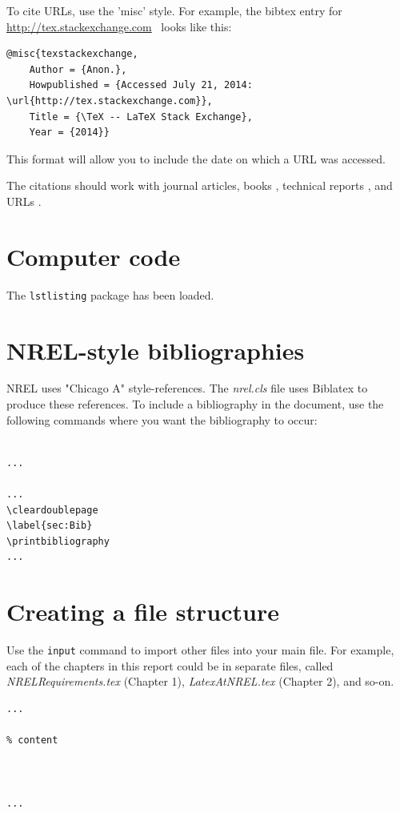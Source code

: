 To cite URLs, use the 'misc' style. For example, the bibtex entry for \href{http://tex.stackexchange.com}{http://tex.stackexchange.com}\ \cite{texstackexchange} looks like this:

\begin{verbatim}
@misc{texstackexchange,
	Author = {Anon.},
	Howpublished = {Accessed July 21, 2014: \url{http://tex.stackexchange.com}},
	Title = {\TeX -- LaTeX Stack Exchange},
	Year = {2014}}
\end{verbatim}

This format will allow you to include the date on which a URL was accessed.

The citations should work with journal articles, books \citep{Lamport_1986_a}, technical reports \citep{TechReportTest}, and URLs \citep{texstackexchange}.

\section{Computer code}
The \texttt{lstlisting} package has been loaded.

\section{NREL-style bibliographies}
NREL uses "Chicago A" style-references. The \emph{nrel.cls} file uses Biblatex to produce these references. To include a bibliography in the document, use the following commands where you want the bibliography to occur:

\begin{verbatim}

...

...
\cleardoublepage
\label{sec:Bib}
\printbibliography
...

\end{verbatim}

\section{Creating a file structure}
\label{sec:FileStructure}
Use the \texttt{input} command to import other files into your main file. For example, each of the chapters in this report could be in separate files, called \emph{NRELRequirements.tex} (Chapter 1), \emph{LatexAtNREL.tex} (Chapter 2), and so-on. 

\begin{verbatim}
...

% content



...
\end{verbatim}

